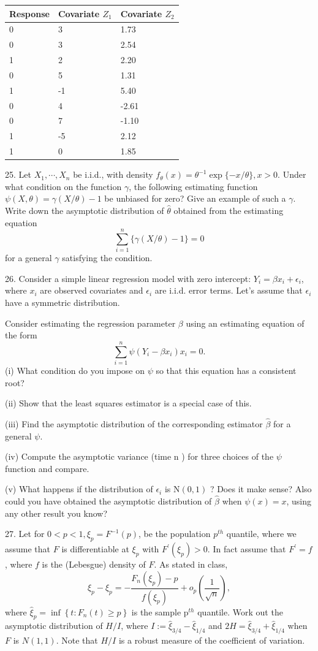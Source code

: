 \documentclass[11pt]{article}
\theoremstyle{definition}
\begin{document}
\begin{tabular}{|l|l|l|}
\hline Response & Covariate $Z_1$ & Covariate $Z_2$ \\
\hline 0 & 3 & 1.73 \\
\hline 0 & 3 & 2.54 \\
\hline 1 & 2 & 2.20 \\
\hline 0 & 5 & 1.31 \\
\hline 1 & -1 & 5.40 \\
\hline 0 & 4 & -2.61 \\
\hline 0 & 7 & -1.10 \\
\hline 1 & -5 & 2.12 \\
\hline 1 & 0 & 1.85 \\
\hline
\end{tabular}

25. Let $X_1, \cdots, X_n$ be i.i.d., with density $f_\theta(x)=\theta^{-1} \exp \{-x / \theta\}, x>0$. Under what condition on the function $\gamma$, the following estimating function $\psi(X, \theta)=\gamma(X / \theta)-1$ be unbiased for zero? Give an example of such a $\gamma$. Write down the asymptotic distribution of $\widehat{\theta}$ obtained from the estimating equation
$$
\sum_{i=1}^n\{\gamma(X / \theta)-1\}=0
$$
for a general $\gamma$ satisfying the condition.

26. Consider a simple linear regression model with zero intercept: $Y_i=\beta x_i+\epsilon_i$, where $x_i$ are observed covariates and $\epsilon_i$ are i.i.d. error terms. Let's assume that $\epsilon_i$ have a symmetric distribution.

Consider estimating the regression parameter $\beta$ using an estimating equation of the form
$$
\sum_{i=1}^n \psi\left(Y_i-\beta x_i\right) x_i=0 .
$$
(i) What condition do you impose on $\psi$ so that this equation has a consistent root?

(ii) Show that the least squares estimator is a special case of this.

(iii) Find the asymptotic distribution of the corresponding estimator $\widehat{\beta}$ for a general $\psi$.

(iv) Compute the asymptotic variance (time n ) for three choices of the $\psi$ function and compare.

(v) What happens if the distribution of $\epsilon_i$ is $\mathrm{N}(0,1)$ ? Does it make sense? Also could you have obtained the asymptotic distribution of $\widehat{\beta}$ when $\psi(x)=x$, using any other result you know?

27. Let for $0<p<1, \xi_p=F^{-1}(p)$, be the population $p^{t h}$ quantile, where we assume that $F$ is differentiable at $\xi_p$ with $F^{\prime}\left(\xi_p\right)>0$. In fact assume that $F^{\prime}=f$, where $f$ is the (Lebesgue) density of $F$. As stated in class,
$$
\widehat{\xi}_p-\xi_p=-\frac{F_n\left(\xi_p\right)-p}{f\left(\xi_p\right)}+o_p\left(\frac{1}{\sqrt{n}}\right),
$$
where $\widehat{\xi}_p=\inf \left\{t: F_n(t) \geq p\right\}$ is the sample $\mathrm{p}^{t h}$ quantile.
Work out the asymptotic distribution of $H / I$, where $I:=\widehat{\xi}_{3 / 4}-\widehat{\xi}_{1 / 4}$ and $2 H=\widehat{\xi}_{3 / 4}+\widehat{\xi}_{1 / 4}$ when $F$ is $N(1,1)$. Note that $H / I$ is a robust measure of the coefficient of variation.
\end{document}
